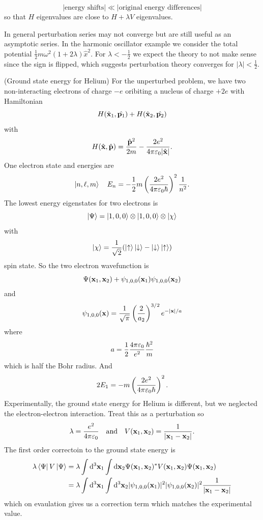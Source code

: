 \documentclass{article}
\begin{document}
\[
	|\text{energy shifts}| \ll |\text{original energy differences}|
\]
so that $ H $ eigenvalues are close to $ H + \lambda V $ eigenvalues.\par
In general perturbation series may not converge but are still useful as an asymptotic series. In the harmonic oscillator example we consider the total potential $ \frac 12 m\omega^2 (1+2\lambda) \hat x^2 $. For $ \lambda < - \frac 12 $ we expect the theory to not make sense since the sign is flipped, which suggests perturbation theory converges for $ |\lambda| < \frac 12 $.
\begin{example}
	(Ground state energy for Helium) For the unperturbed problem, we have two non-interacting electrons of charge $ -e $ oribiting a nucleus of charge $ +2e $ with Hamiltonian
	\[
		H(\hat {\mathbf{x}}_1, \hat{\mathbf p_1}) + H(\hat {\mathbf{x}}_2,\hat{\mathbf p_2})
	\]
	with
	\[
		H(\hat {\mathbf{x}},\hat{\mathbf p}) = \frac{\hat{\mathbf p}^2}{2m} - \frac{2e^2}{4\pi \varepsilon_0 |\hat{\mathbf x}|}.
	\]
	One electron state and energies are
	\[
		\ket{n, \ell, m} \quad E_n = -\frac 12 m \left(\frac {2e^2}{4\pi \varepsilon_0 \hbar}\right)^2 \frac 1{n^2}.
	\]
	The lowest energy eigenstates for two electrons is
	\[
		\ket \Psi = \ket{1,0,0} \otimes \ket{1,0,0} \otimes \ket\chi
	\]
	with
	\[
		\ket\chi = \frac 1{\sqrt 2}(\ket \uparrow\ket \downarrow - \ket\downarrow\ket\uparrow)
	\]
	spin state. So the two electron wavefunction is
	\[
		\Psi (\mathbf x_1,\mathbf x_2) + \psi_{1,0,0}(\mathbf{x}_1)\psi_{1,0,0}(\mathbf{x}_2)
	\]
	and
	\[
		\psi_{1,0,0}(\mathbf x) = \frac 1{\sqrt \pi} \left(\frac 2{a_2}\right)^{3/2} e^{-|\mathbf{x}|/a}
	\]
	where
	\[
		a = \frac 12 \frac{4\pi \varepsilon_0}{e^2}\frac{\hbar^2}{m}
	\]
	which is half the Bohr radius. And
	\[
		2E_1 = -m \left(\frac{2e^2}{4\pi \varepsilon_0\hbar}\right)^2.
	\]
	Experimentally, the ground state energy for Helium is different, but we neglected the electron-electron interaction. Treat this as a perturbation so
	\[
		\lambda = \frac{e^2}{4\pi \varepsilon_0} \quad \text{and} \quad V(\mathbf{x}_1,\mathbf{x}_2) = \frac 1{|\mathbf{x}_1-\mathbf{x}_2|}.
	\]
	The first order correctoin to the ground state energy is
	\begin{align*}
		\lambda \bra{\Psi} V \ket{\Psi} &= \lambda \int \mathrm d^3 \mathbf{x}_1 \int \mathrm d\mathbf{x}_2 \Psi(\mathbf{x}_1,\mathbf{x}_2)^* V(\mathbf{x}_1,\mathbf{x}_2) \Psi(\mathbf{x}_1,\mathbf{x}_2) \\
						&= \lambda \int \mathrm d^3 \mathbf{x}_1 \int \mathrm d^3 \mathbf{x}_2 |\psi_{1,0,0}(\mathbf{x}_1)|^2|\psi_{1,0,0}(\mathbf{x}_2)|^2 \frac 1{|\mathbf{x}_1-\mathbf{x}_2|}
	\end{align*}
	 which on evaulation gives us a correction term which matches the experimental value.
\end{example}
\end{document}
